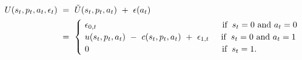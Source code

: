 \begin{equation}
\begin{split}
     U(s_{t}, p_{t}, a_{t}, \epsilon_{t}) \ 
     & = \ \tilde{U}(s_{t}, p_{t}, a_{t}) \ + \ \epsilon(a_{t}) \\
     & = \ 
     \begin{cases}
          \ \epsilon_{0,t} \hspace{5.2cm} \text{if} \hspace{0.2cm} s_{t} = 0 \text{ and } a_{t} = 0 \\
          \ u(s_{t}, p_{t}, a_{t}) \ - \ c(s_{t}, p_{t}, a_{t}) \ + \ \epsilon_{1,t} \hspace{0.5cm} \text{if} \hspace{0.2cm} s_{t} = 0 \text{ and } a_{t} = 1 \\ 
          \ 0 \hspace{5.5cm} \text{if} \hspace{0.2cm} s_{t} = 1.
     \end{cases}
\end{split}
\label{Equation:DCDP-Model_Utility-Function}
\end{equation}